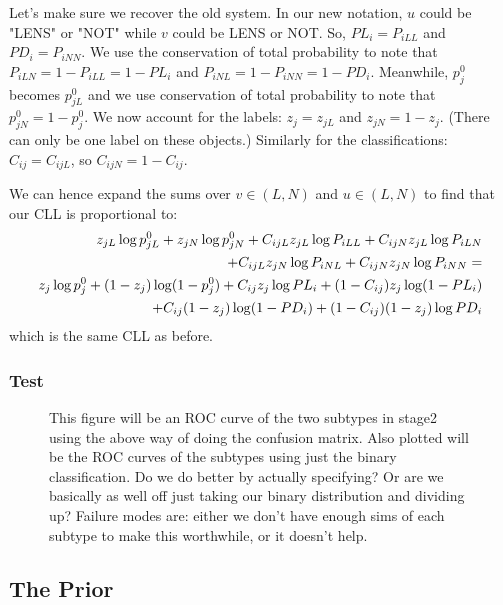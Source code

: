 \documentclass[useAMS,usenatbib,a4paper]{mn2e}
\begin{document}
Let's make sure we recover the old system. In our new notation, $u$ could be
"LENS" or "NOT" while $v$ could be LENS or NOT. So, $PL_i = P_{iLL}$ and $PD_i
= P_{iNN}$. We use the conservation of total probability to note that
$P_{iLN} = 1 - P_{iLL} = 1 - PL_i$ and $P_{iNL} = 1 - P_{iNN} = 1 -
PD_i$. Meanwhile, $p_j^0$ becomes $p_{jL}^0$ and we use conservation of total
probability to note that $p_{jN}^0 = 1 - p_{j}^0$. We now account for the
labels: $z_{j} = z_{jL}$ and $z_{jN} = 1 - z_{j}$. (There can only be one
label on these objects.) Similarly for the classifications: $C_{ij} = C_{ijL}$,
so $C_{ijN} = 1 - C_{ij}$.

We can hence expand the
sums over $v \in (L, N)$ and $u \in (L, N)$ to find that our CLL is
proportional to:
\begin{align}
z_{jL} \log p_{jL}^0 + z_{jN} \log p_{jN}^0 +
C_{ijL} z_{jL} \log P_{iLL} + C_{ijN} z_{jL} \log P_{iLN} \notag\\ + C_{ijL} z_{jN} \log
P_{iNL} + C_{ijN} z_{jN} \log P_{iNN} = \notag\\
z_j \log p_j^0 + (1 - z_j) \log (1 - p_j^0) + C_{ij} z_j \log PL_i + (1 -
C_{ij}) z_j \log (1 - PL_i) \notag\\
+ C_{ij} (1 - z_j) \log (1 - PD_i) + (1 - C_{ij})
(1 - z_j) \log PD_i
\end{align}
which is the same CLL as before.

\subsubsection{Test}

\begin{figure}
\begin{center}
\end{center}
\caption{This figure will be an ROC curve of the two subtypes in stage2 using
the above way of doing the confusion matrix. Also plotted will be the ROC
curves of the subtypes using just the binary classification. Do we do better by actually specifying? Or are we basically as well
off just taking our binary distribution and dividing up? Failure modes are:
either we don't have enough sims of each subtype to make this worthwhile, or it
doesn't help.}
\label{fig:ext:test:roc}
\end{figure}

\subsection{The Prior}
\end{document}
